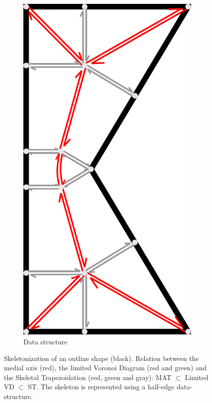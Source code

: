 \begin{figure}
\begin{subfigure}[t]{\figwidth}
\includegraphics[height=\figwidthTwo]{sources-method-half-edge-datastructure.pdf}
\caption{Data structure}\label{shape_decomposition_datastructure}
\end{subfigure}
\caption{
Skeletonization of an outline shape (black).
Relation between the medial axis (red), the limited Voronoi Diagram (red and green) and the Skeletal Trapezoidation (red, green and gray): MAT $\subset$ Limited VD $\subset$ ST.
 The skeleton is represented using a half-edge data-structure.
}
\label{skeletonization_comparison}
\end{figure}




